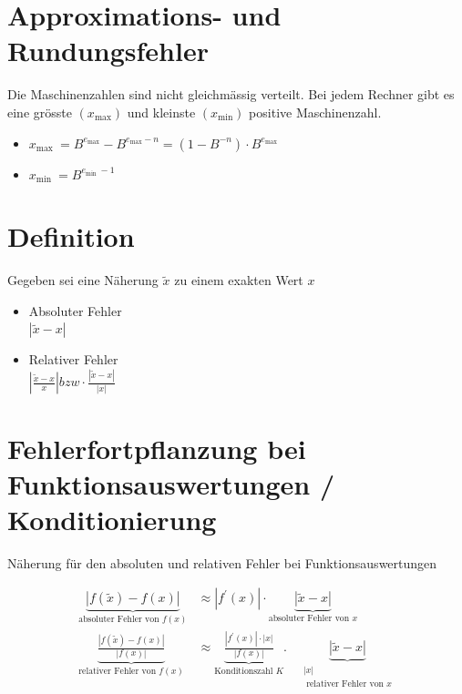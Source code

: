 \documentclass[10pt]{article}
\begin{document}
\section*{Approximations- und Rundungsfehler}
Die Maschinenzahlen sind nicht gleichmässig verteilt. Bei jedem Rechner gibt es eine grösste $\left(x_{\max }\right)$ und kleinste $\left(x_{\min }\right)$ positive Maschinenzahl.

\begin{itemize}
  \item $x_{\text {max }}=B^{e_{\max }}-B^{e_{\max }-n}=\left(1-B^{-n}\right) \cdot B^{e_{\max }}$
  \item $x_{\text {min }}=B^{e_{\text {min }}-1}$
\end{itemize}

\section*{Definition}
Gegeben sei eine Näherung $\tilde{x}$ zu einem exakten Wert $x$

\begin{itemize}
  \item Absoluter Fehler\\
$|\tilde{x}-x|$
  \item Relativer Fehler\\
$\left|\frac{\tilde{x}-x}{x}\right| b z w \cdot \frac{|\tilde{x}-x|}{|x|}$
\end{itemize}

\section*{Fehlerfortpflanzung bei Funktionsauswertungen / Konditionierung}
Näherung für den absoluten und relativen Fehler bei Funktionsauswertungen

$$
\begin{aligned}
\underbrace{|f(\tilde{x})-f(x)|}_{\text {absoluter Fehler von } f(x)} & \approx\left|f^{\prime}(x)\right| \cdot \underbrace{|\tilde{x}-x|}_{\text {absoluter Fehler von } x} \\
\underbrace{\frac{|f(\tilde{x})-f(x)|}{|f(x)|}}_{\text {relativer Fehler von } f(x)} & \approx \underbrace{\frac{\left|f^{\prime}(x)\right| \cdot|x|}{|f(x)|}}_{\text {Konditionszahl } K} . \quad \underbrace{|\tilde{x}-x|}_{\begin{array}{c}
|x| \\
\text { relativer Fehler von } x
\end{array}}
\end{aligned}
$$
\end{document}
